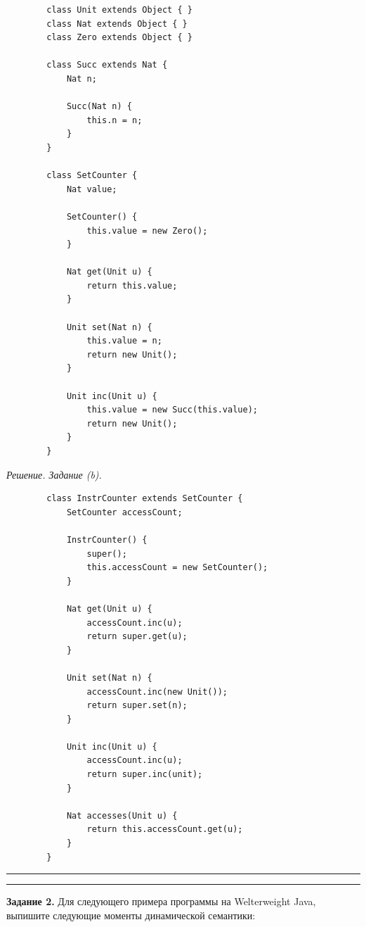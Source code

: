 \documentclass[landscape, 11pt]{report}
\begin{document}
	\begin{verbatim}
		class Unit extends Object { }
		class Nat extends Object { }
		class Zero extends Object { }
		
		class Succ extends Nat {
		    Nat n;
		
		    Succ(Nat n) {
		        this.n = n;
		    }
		}
	
		class SetCounter {
		    Nat value;
		
		    SetCounter() {
		        this.value = new Zero();
		    }
	    
		    Nat get(Unit u) {
		        return this.value;
		    }

		    Unit set(Nat n) {
		        this.value = n;
		        return new Unit();
		    }

		    Unit inc(Unit u) {
		        this.value = new Succ(this.value);
		        return new Unit();
		    }
		}
	\end{verbatim}
	
	\newpage

	\textit{Решение. Задание (b).}
	
	\vspace{-0.2cm}
	
	\begin{verbatim}
		class InstrCounter extends SetCounter {
		    SetCounter accessCount;
			
		    InstrCounter() {
		        super();
		        this.accessCount = new SetCounter();
		    }
			
		    Nat get(Unit u) {
		        accessCount.inc(u);
		        return super.get(u);
		    }
			
		    Unit set(Nat n) {
		        accessCount.inc(new Unit());
		        return super.set(n);
		    }
			
		    Unit inc(Unit u) {
		        accessCount.inc(u);
		        return super.inc(unit);
			}
		
		    Nat accesses(Unit u) {
		        return this.accessCount.get(u);
		    }
		}
	\end{verbatim}
	
	\vspace{0.2cm}
	\hrule
	
	\newpage

	
	\hrule
	\vspace{0.5cm}
	
	\textbf{Задание 2.} Для следующего примера программы на Welterweight Java, выпишите следующие моменты динамической семантики:
	
\end{document}
